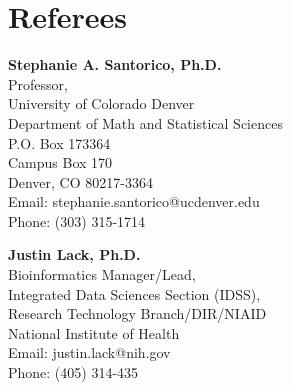 \section{Referees}

\parbox{0.5\textwidth}{ %
	\textbf{Stephanie A. Santorico, Ph.D.}\\
	Professor,\\
	University of Colorado Denver\\
	Department of Math and Statistical Sciences\\
	P.O. Box 173364\\
	Campus Box 170\\
	Denver, CO 80217-3364\\
	Email: stephanie.santorico@ucdenver.edu\\
	Phone: (303) 315-1714
}
\hfill %
\parbox{0.5\textwidth}{ \textbf{Justin Lack, Ph.D.}\\
	Bioinformatics Manager/Lead,\\
	Integrated Data Sciences Section (IDSS),\\
    Research Technology Branch/DIR/NIAID\\
	National Institute of Health\\
	Email: justin.lack@nih.gov\\
	Phone: (405) 314-435}


